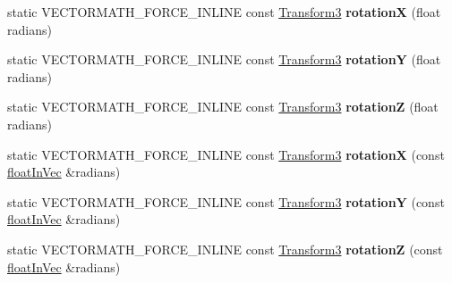 \begin{DoxyCompactItemize}
\item 
\mbox{\label{classVectormath_1_1Aos_1_1Transform3_aac1a34d0b1093fe18a8df1ae1c3af04e}} 
static V\+E\+C\+T\+O\+R\+M\+A\+T\+H\+\_\+\+F\+O\+R\+C\+E\+\_\+\+I\+N\+L\+I\+NE const \hyperlink{classVectormath_1_1Aos_1_1Transform3}{Transform3} {\bfseries rotationX} (float radians)
\item 
\mbox{\label{classVectormath_1_1Aos_1_1Transform3_a3c07b66c2ec540b4a813542988b625e9}} 
static V\+E\+C\+T\+O\+R\+M\+A\+T\+H\+\_\+\+F\+O\+R\+C\+E\+\_\+\+I\+N\+L\+I\+NE const \hyperlink{classVectormath_1_1Aos_1_1Transform3}{Transform3} {\bfseries rotationY} (float radians)
\item 
\mbox{\label{classVectormath_1_1Aos_1_1Transform3_a233abcc5abac075585415de5a868d399}} 
static V\+E\+C\+T\+O\+R\+M\+A\+T\+H\+\_\+\+F\+O\+R\+C\+E\+\_\+\+I\+N\+L\+I\+NE const \hyperlink{classVectormath_1_1Aos_1_1Transform3}{Transform3} {\bfseries rotationZ} (float radians)
\item 
\mbox{\label{classVectormath_1_1Aos_1_1Transform3_ab6af507e81e1831bde20ebbb411a95a2}} 
static V\+E\+C\+T\+O\+R\+M\+A\+T\+H\+\_\+\+F\+O\+R\+C\+E\+\_\+\+I\+N\+L\+I\+NE const \hyperlink{classVectormath_1_1Aos_1_1Transform3}{Transform3} {\bfseries rotationX} (const \hyperlink{classVectormath_1_1floatInVec}{float\+In\+Vec} \&radians)
\item 
\mbox{\label{classVectormath_1_1Aos_1_1Transform3_a512ea92466eb6517a522841dec0ee1db}} 
static V\+E\+C\+T\+O\+R\+M\+A\+T\+H\+\_\+\+F\+O\+R\+C\+E\+\_\+\+I\+N\+L\+I\+NE const \hyperlink{classVectormath_1_1Aos_1_1Transform3}{Transform3} {\bfseries rotationY} (const \hyperlink{classVectormath_1_1floatInVec}{float\+In\+Vec} \&radians)
\item 
\mbox{\label{classVectormath_1_1Aos_1_1Transform3_ad577616a6476ef781c0bc327abe35158}} 
static V\+E\+C\+T\+O\+R\+M\+A\+T\+H\+\_\+\+F\+O\+R\+C\+E\+\_\+\+I\+N\+L\+I\+NE const \hyperlink{classVectormath_1_1Aos_1_1Transform3}{Transform3} {\bfseries rotationZ} (const \hyperlink{classVectormath_1_1floatInVec}{float\+In\+Vec} \&radians)
\item 

\end{DoxyCompactItemize}
